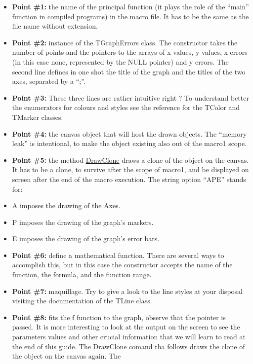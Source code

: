 \documentclass{article}
\begin{document}
\begin{itemize}
\item
  \textbf{Point \#1:} the name of the principal function (it plays the
  role of the ``main'' function in compiled programs) in the macro file.
  It has to be the same as the file name without extension.
\item
  \textbf{Point \#2:} instance of the TGraphErrors class. The
  constructor takes the number of points and the pointers to the arrays
  of x values, y values, x errors (in this case none, represented by the
  NULL pointer) and y errors. The second line defines in one shot the
  title of the graph and the titles of the two axes, separated by a
  ``;''.
\item
  \textbf{Point \#3:} These three lines are rather intuitive right ? To
  understand better the enumerators for colours and styles see the
  reference for the TColor and TMarker classes.
\item
  \textbf{Point \#4:} the canvas object that will host the drawn
  objects. The ``memory leak'' is intentional, to make the object
  existing also out of the macro1 scope.
\item
  \textbf{Point \#5:} the method
  \href{https://root.cern.ch/doc/master/classTObject.html\#a45d0875bf30660d0903a93d690ff9f7e}{DrawClone}
  draws a clone of the object on the canvas. It has to be a clone, to
  survive after the scope of macro1, and be displayed on screen after
  the end of the macro execution. The string option ``APE'' stands for:
\item
  A imposes the drawing of the Axes.
\item
  P imposes the drawing of the graph's markers.
\item
  E imposes the drawing of the graph's error bars.
\item
  \textbf{Point \#6:} define a mathematical function. There are several
  ways to accomplish this, but in this case the constructor accepts the
  name of the function, the formula, and the function range.
\item
  \textbf{Point \#7:} maquillage. Try to give a look to the line styles
  at your disposal visiting the documentation of the TLine class.
\item
  \textbf{Point \#8:} fits the f function to the graph, observe that the
  pointer is passed. It is more interesting to look at the output on the
  screen to see the parameters values and other crucial information that
  we will learn to read at the end of this guide. The DrawClone comand
  tha follows draws the clone of the object on the canvas again. The

\end{itemize}
\end{document}

